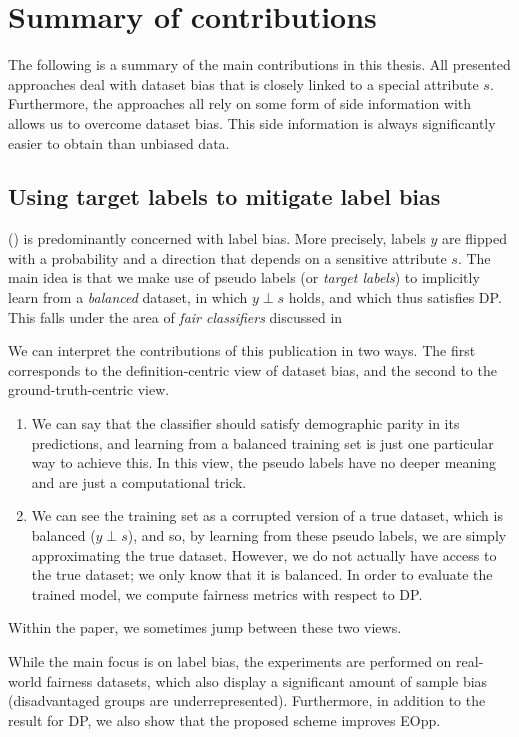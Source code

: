\chapter{Summary of contributions}\label{ch:content}
The following is a summary of the main contributions in this thesis.
All presented approaches deal with dataset bias that is closely linked to a special attribute $s$.
Furthermore, the approaches all rely on some form of side information with allows us to overcome dataset bias.
This side information is always significantly easier to obtain than unbiased data.

\section{Using target labels to mitigate label bias}\label{sec:target-labels}
\citet{kehrenberg2020tuning} () is predominantly concerned with label bias.
More precisely, labels \(y\) are flipped with a probability and a direction that depends on a sensitive attribute \(s\).
The main idea is that we make use of pseudo labels (or \emph{target labels})
to implicitly learn from a \emph{balanced} dataset,
in which \(y\perp s\) holds, and which thus satisfies \acf{DP}.
This falls under the area of \emph{fair classifiers} discussed in 

We can interpret the contributions of this publication in two ways.
The first corresponds to the definition-centric view of dataset bias,
and the second to the ground-truth-centric view.
\begin{enumerate}
  \item
    We can say that the classifier should satisfy demographic parity in its predictions,
    and learning from a balanced training set is just one particular way to achieve this.
    In this view, the pseudo labels have no deeper meaning and are just a computational trick.
  \item
    We can see the training set as a corrupted version of a true dataset, which is balanced (\(y\perp s\)),
    and so, by learning from these pseudo labels, we are simply approximating the true dataset.
    However, we do not actually have access to the true dataset; we only know that it is balanced.
    In order to evaluate the trained model, we compute fairness metrics with respect to \ac{DP}.
\end{enumerate}
Within the paper, we sometimes jump between these two views.

While the main focus is on label bias,
the experiments are performed on real-world fairness datasets,
which also display a significant amount of sample bias (disadvantaged groups are underrepresented).
Furthermore, in addition to the result for \ac{DP}, we also show that the proposed scheme improves \acf{EOpp}.

